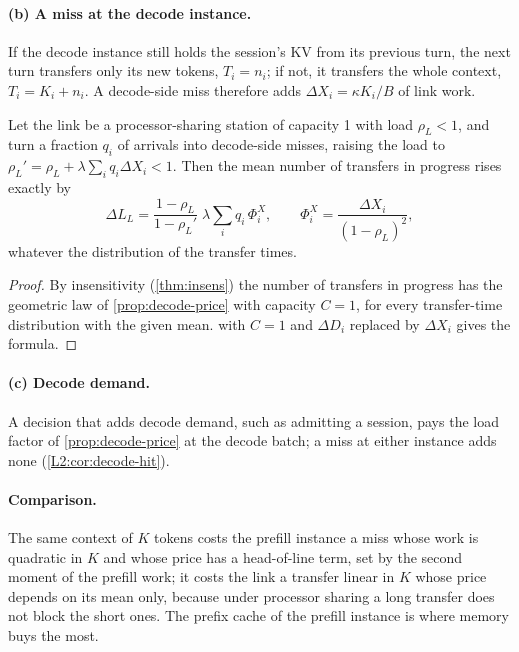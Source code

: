 \paragraph{(b) A miss at the decode instance.} If the decode instance still holds the
session's KV from its previous turn, the next turn transfers only its new tokens,
$T_i=n_i$; if not, it transfers the whole context, $T_i=K_i+n_i$. A decode-side miss
therefore adds $\Delta X_i=\kappa K_i/B$ of link work.

\begin{proposition}\label{L5:prop:link-price}
Let the link be a processor-sharing station of capacity 1 with load $\rho_L<1$, and
turn a fraction $q_i$ of arrivals into decode-side misses, raising the load to
$\rho_L'=\rho_L+\lambda\sum_iq_i\Delta X_i<1$. Then the mean number of transfers in
progress rises exactly by
\[
  \Delta L_L=\frac{1-\rho_L}{1-\rho_L'}\;\lambda\sum_iq_i\,\Phi^X_i,\qquad
  \Phi^X_i=\frac{\Delta X_i}{(1-\rho_L)^2},
\]
whatever the distribution of the transfer times.
\end{proposition}

\begin{proof}
By insensitivity (\cref{thm:insens}) the number of transfers in progress has the
geometric law of \cref{prop:decode-price} with capacity $C=1$, for every transfer-time
distribution with the given mean.  with $C=1$ and $\Delta D_i$
replaced by $\Delta X_i$ gives the formula.
\end{proof}

\paragraph{(c) Decode demand.} A decision that adds decode demand, such as admitting a
session, pays the load factor of \cref{prop:decode-price} at the decode batch; a miss at
either instance adds none (\cref{L2:cor:decode-hit}).

\paragraph{Comparison.} The same context of $K$ tokens costs the prefill instance a
miss whose work is quadratic in $K$ and whose price has a head-of-line term, set by the
second moment of the prefill work; it costs the link a transfer linear in $K$ whose
price depends on its mean only, because under processor sharing a long transfer does not
block the short ones. The prefix cache of the prefill instance is where memory buys the
most.

